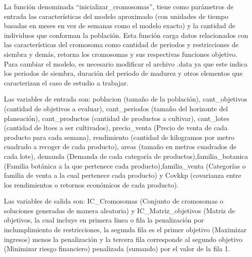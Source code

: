 \documentclass[11pt]{article}
\begin{document}
La función denominada ``inicializar\_cromosomas'', tiene como parámetros
de entrada las características del modelo aproximado (con unidades de
tiempo basadas en meses en vez de semanas como el modelo exacto) y la
cantidad de individuos que conforman la población. Esta función carga
datos relacionados con las características del cromosoma como cantidad
de periodos y restricciones de siembra y demás, retorna los cromosomas y
sus respectivas funciones objetivo. Para cambiar el modelo, es necesario
modificar el archivo .data ya que este indica los periodos de siembra,
duración del periodo de madurez y otros elementos que caracterizan el
caso de estudio a trabajar.

Las variables de entrada son: poblacion (tamaño de la población),
cant\_objetivos (cantidad de objetivos a evaluar), cant\_periodos
(tamaño del horizonte del planeación), cant\_productos (cantidad de
productos a cultivar), cant\_lotes (cantidad de ltoes a ser cultivados),
precio\_venta (Precio de venta de cada producto para cada semana),
rendimiento (cantidad de kilogramos por metro cuadrado a recoger de cada
producto), areas (tamaño en metros cuadrados de cada lote), demanda
(Demanda de cada categoría de productos),familia\_botanica (Familia
botánica a la que pertenece cada producto),familia\_venta (Categorías o
familia de venta a la cual pertenece cada producto) y Covkkp (covarianza
entre los rendimientos o retornos económicos de cada producto).

Las variables de salida son: IC\_Cromosomas (Conjunto de cromosomas o
soluciones generadas de manera aleatoria) y IC\_Matriz\_objetivos
(Matriz de objetivos, la cual incluye en primera linea o fila la
penalización por inclumplimiento de restricciones, la segunda fila es el
primer objetivo (Maximizar ingresos) menos la penalización y la tercera
fila corresponde al segundo objetivo (Minimizar riesgo financiero)
penalizada (sumando) por el valor de la fila 1.
\end{document}
